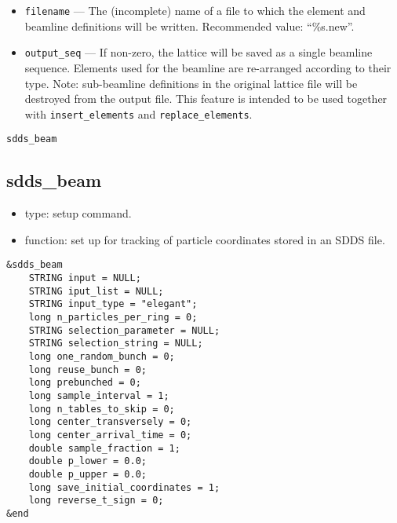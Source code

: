 \documentclass[11pt]{article}
\begin{document}
\begin{itemize}
\item \verb|filename| --- The (incomplete) name of a file to which the element and beamline definitions
will be written.  Recommended value: ``\%s.new''.
\item \verb|output_seq| --- If non-zero, the lattice will be saved as a single beamline sequence.
Elements used for the beamline are re-arranged according to their type. Note: 
sub-beamline definitions in the original lattice file will be destroyed from the output file.
This feature is intended to be used 
together with \verb|insert_elements| and \verb|replace_elements|. 
\end{itemize}

\begin{latexonly}
\newpage
\begin{center}{\Large\verb|sdds_beam|}\end{center}
\end{latexonly}
\subsection{sdds\_beam \label{subsec:sddsbeam}}

\begin{itemize}
\item type: setup command.
\item function: set up for tracking of particle coordinates stored in an SDDS file.
\end{itemize}

\begin{verbatim}
&sdds_beam
    STRING input = NULL;
    STRING iput_list = NULL;
    STRING input_type = "elegant";
    long n_particles_per_ring = 0;
    STRING selection_parameter = NULL;
    STRING selection_string = NULL;
    long one_random_bunch = 0;
    long reuse_bunch = 0;
    long prebunched = 0;
    long sample_interval = 1;
    long n_tables_to_skip = 0;
    long center_transversely = 0;
    long center_arrival_time = 0;
    double sample_fraction = 1;
    double p_lower = 0.0;
    double p_upper = 0.0;
    long save_initial_coordinates = 1;
    long reverse_t_sign = 0;
&end
\end{verbatim}
\end{document}
